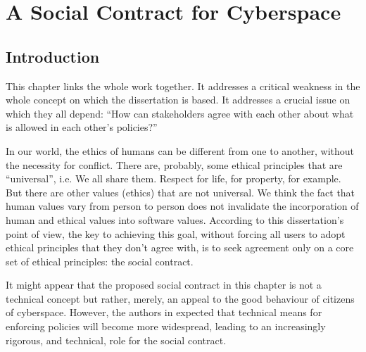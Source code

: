 \chapter{A Social Contract for Cyberspace}
\section{Introduction}
This chapter links the whole work together.  It addresses a critical
weakness in the whole concept on which the dissertation is based. It
addresses a crucial issue on which they all depend: ``How can stakeholders
agree with each other about what is allowed in each other's policies?''

In our world, the ethics of humans can be different from one to another,
without the necessity for conflict. There are, probably, some ethical
principles that are ``universal'', i.e. We all share them. Respect for life,
for property, for example. But there are other values (ethics) that are
not universal. We think the fact that human values vary from person to
person does not invalidate the incorporation of human and ethical values
into software values. According to this dissertation's point of view, the
key to achieving this goal, without forcing all users to adopt ethical
principles that they don't agree with, is to seek agreement only on a
core set of ethical principles: the social contract.

It might appear that the proposed social contract in this chapter is not a
technical concept but rather, merely, an appeal to the good behaviour of
citizens of cyberspace. However, the authors in \cite{sheniar2021social}
expected that technical means for enforcing policies will become more
widespread, leading to an increasingly rigorous, and technical, role
for the social contract.
